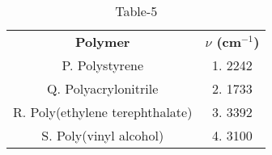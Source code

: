 \begin{table}[htbp]
  \centering
  \caption{Table-5}
  \label{tab:table/table5.tex}
  \begin{tabular}{cc}
\textbf{Polymer} & \textbf{$\nu$ (cm$^{-1}$)}\\

P. Polystyrene & 1. 2242\\
Q. Polyacrylonitrile & 2. 1733\\
R. Poly(ethylene terephthalate) & 3. 3392\\
S. Poly(vinyl alcohol) & 4. 3100\\
  
  
  
  \end{tabular}
\end{table}
